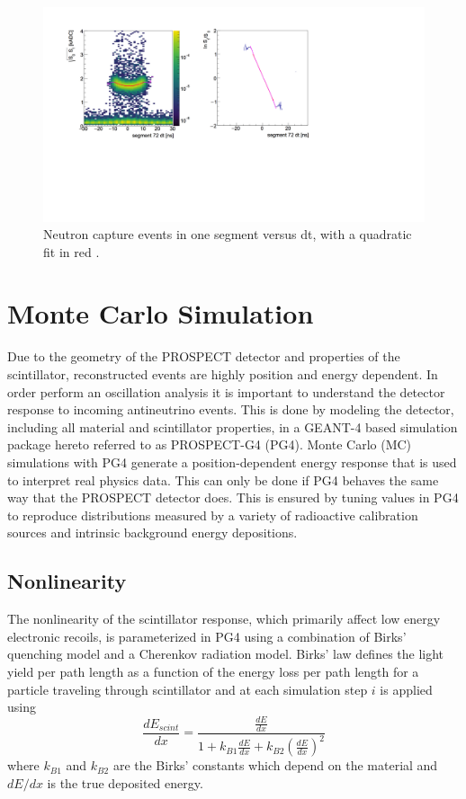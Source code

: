 \begin{figure}[h]
	\centering
	\includegraphics[width=0.5\linewidth]{tex/5-analysis-images/nLi_vs_dt}
	\caption{Neutron capture events in one segment versus dt, with a quadratic fit in red \cite{MM:2314}.}
	\label{fig:nlivsdt}
\end{figure}



\section{Monte Carlo Simulation}

Due to the geometry of the PROSPECT detector and properties of the scintillator, reconstructed events are highly position and energy dependent. 
In order perform an oscillation analysis it is important to understand the detector response to incoming antineutrino events. 
This is done by modeling the detector, including all material and scintillator properties, in a GEANT-4 based simulation package hereto referred to as PROSPECT-G4 (PG4).
Monte Carlo (MC) simulations with PG4 generate a position-dependent energy response that is used to interpret real physics data. 
This can only be done if PG4 behaves the same way that the PROSPECT detector does. 
This is ensured by tuning values in PG4 to reproduce distributions measured by a variety of radioactive calibration sources and intrinsic background energy depositions.

\subsection{Nonlinearity}

The nonlinearity of the scintillator response, which primarily affect low energy electronic recoils, is parameterized in PG4 using a combination of Birks' quenching model \cite{BIRKS1964269} and a Cherenkov radiation model.
Birks' law defines the light yield per path length as a function of the energy loss per path length for a particle traveling through scintillator and at each simulation step $i$ is applied using
\begin{equation}
	\frac{dE_{scint}}{dx} = \frac{\frac{dE}{dx}}{1 + k_{B1}\frac{dE}{dx} + k_{B2}\left(\frac{dE}{dx}\right)^2}
\end{equation}
where $k_{B1}$ and $k_{B2}$ are the Birks' constants which depend on the material and $dE/dx$ is the true deposited energy.

